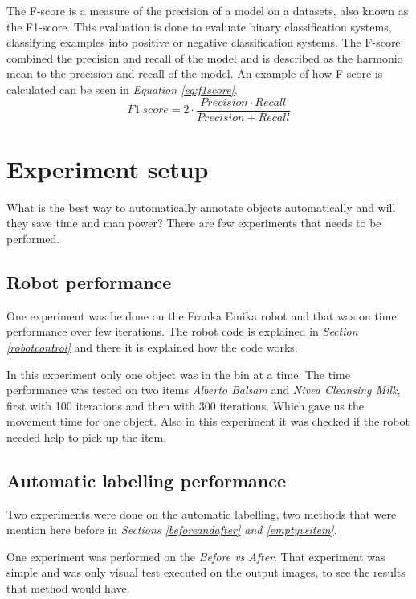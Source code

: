 The F-score is a measure of the precision of a model on a datasets, also known as the F1-score. This evaluation is done to evaluate binary classification systems, classifying examples into positive or negative classification systems. 
The F-score combined the precision and recall of the model and is described as the harmonic mean to the precision and recall of the model\cite{wood_f-score_2019}.
An example of how F-score is calculated can be seen in \textit{Equation \ref{eq:f1score}}.
\begin{equation}
    F1\ score = 2 \cdot \frac{Precision \cdot Recall}{Precision + Recall}
    \label{eq:f1score}
\end{equation}


\section{Experiment setup}
What is the best way to automatically annotate objects automatically and will they save time and man power? There are few experiments that needs to be performed. 

\subsection{Robot performance}
One experiment was be done on the Franka Emika robot and that was on time performance over few iterations. The robot code is explained in \textit{Section \ref{robotcontrol}} and there it is explained how the code works.

In this experiment only one object was in the bin at a time. The time performance was tested on two items \textit{Alberto Balsam} and \textit{Nivea Cleansing Milk}, first with 100 iterations and then with 300 iterations. Which gave us the movement time for one object. Also in this experiment it was checked if the robot needed help to pick up the item.

\subsection{Automatic labelling performance}
Two experiments were done on the automatic labelling, two methods that were mention here before in \textit{Sections \ref{beforeandafter} and \ref{emptyvsitem}}. 

One experiment was performed on the \textit{Before vs After}. That experiment was simple and was only visual test executed on the output images, to see the results that method would have.

